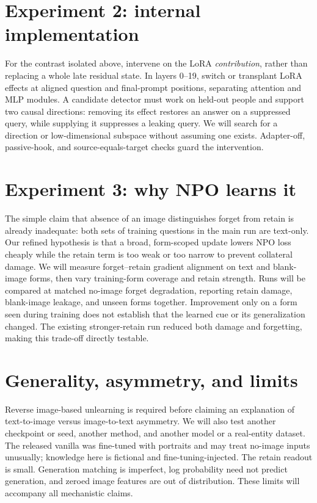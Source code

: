 \documentclass[11pt]{article}
\begin{document}
\section{Experiment 2: internal implementation}
For the contrast isolated above, intervene on the LoRA \emph{contribution}, rather
than replacing a whole late residual state. In layers 0--19, switch or transplant
LoRA effects at aligned question and final-prompt positions, separating attention
and MLP modules. A candidate detector must work on held-out people and support
two causal directions: removing its effect restores an answer on a suppressed
query, while supplying it suppresses a leaking query. We will search for a
direction or low-dimensional subspace without assuming one exists. Adapter-off,
passive-hook, and source-equals-target checks guard the intervention.

\section{Experiment 3: why NPO learns it}
The simple claim that absence of an image distinguishes forget from retain is
already inadequate: both sets of training questions in the main run are text-only.
Our refined hypothesis is that a broad, form-scoped update lowers NPO loss
cheaply while the retain term is too weak or too narrow to prevent collateral
damage. We will measure forget--retain gradient alignment on text and blank-image
forms, then vary training-form coverage and retain strength. Runs will be compared
at matched no-image forget degradation, reporting retain damage, blank-image
leakage, and unseen forms together. Improvement only on a form seen during
training does not establish that the learned cue or its generalization changed.
The existing stronger-retain run reduced both damage and forgetting, making
this trade-off directly testable.

\section{Generality, asymmetry, and limits}
Reverse image-based unlearning is required before claiming an explanation of
text-to-image versus image-to-text asymmetry. We will also test another checkpoint
or seed, another method, and another model or a real-entity dataset. The released
vanilla was fine-tuned with portraits and may treat no-image inputs unusually;
knowledge here is fictional and fine-tuning-injected. The retain readout is small.
Generation matching is imperfect, log probability need not predict generation,
and zeroed image features are out of distribution. These limits will accompany
all mechanistic claims.
\end{document}
